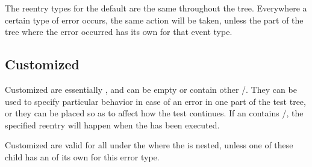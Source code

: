 The reentry types for the default \gdehandlers{} are the same throughout the 
tree. Everywhere a certain type of error occurs, the same action will be taken, 
unless the part of the tree where the error occurred has its own 
\gdehandler{} for that event type.  

\subsection{Customized \gdehandlers{}}
Customized \gdehandlers{} are essentially \gdcases{}, and can be empty or contain other \gdsteps{}/\gdcases{}. 
They can be used to specify particular behavior in case of an error in one part of the test tree, or they can be placed so as to affect how the test continues. If an \gdehandler{} contains \gdsteps{}/\gdcases{}, the specified reentry will happen when the \gdehandler{} has been executed. 

Customized \gdehandlers{} are valid for all \gdcases{} under the \gdcase{} where the \gdehandler{} is nested, unless one of these child \gdcases{} has an \gdehandler{} of its own for this error type. 
